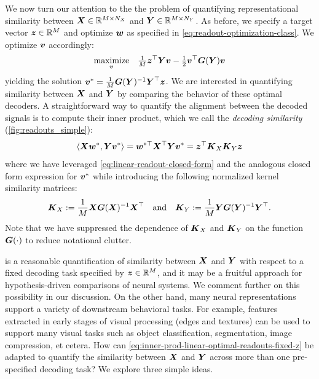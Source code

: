 We now turn our attention to the the problem of quantifying representational similarity between $\boldsymbol{X} \in \mathbb{R}^{M \times N_X}$ and $\boldsymbol{Y} \in \mathbb{R}^{M \times N_Y}$.
As before, we specify a target vector $\boldsymbol{z} \in \mathbb{R}^M$ and optimize $\boldsymbol{w}$ as specified in \cref{eq:readout-optimization-class}.
We optimize $\boldsymbol{v}$ accordingly:
\begin{align}
\underset{\boldsymbol{v}}{\text{maximize}} \quad \tfrac{1}{M} \boldsymbol{z}^\top \boldsymbol{Y} \boldsymbol{v} - \tfrac{1}{2} \boldsymbol{v}^\top \boldsymbol{G}(\boldsymbol{Y}) \boldsymbol{v}
\end{align}
yielding the solution $\boldsymbol{v}^* = \tfrac{1}{M} \boldsymbol{G}(\boldsymbol{Y})^{-1} \boldsymbol{Y}^\top \boldsymbol{z}$.
We are interested in quantifying similarity between $\boldsymbol{X}$ and $\boldsymbol{Y}$ by comparing the behavior of these optimal decoders.
A straightforward way to quantify the alignment between the decoded signals is to compute their inner product, which we call the \emph{decoding similarity} (\cref{fig:readouts_simple}):
\begin{equation}
\label{eq:inner-prod-linear-optimal-readouts-fixed-z}
\langle \boldsymbol{X} \boldsymbol{w}^*, \boldsymbol{Y} \boldsymbol{v}^* \rangle = \boldsymbol{w}^{*\top} \boldsymbol{X}^\top \boldsymbol{Y} \boldsymbol{v}^* = \boldsymbol{z}^\top \boldsymbol{K}_X\boldsymbol{K}_Y \boldsymbol{z} 
\end{equation}
where we have leveraged \cref{eq:linear-readout-closed-form} and the analogous closed form expression for $\boldsymbol{v}^*$ while introducing the following normalized kernel similarity matrices:
\begin{equation}
\label{eq:change-of-variables-generalized-whitening}
    \boldsymbol{K}_X:=\frac{1}{M}\boldsymbol{X}\boldsymbol{G}(\boldsymbol{X})^{-1}\boldsymbol{X}^\top \quad \text{and} \quad \boldsymbol{K}_Y:=\frac{1}{M}\boldsymbol{Y}\boldsymbol{G}(\boldsymbol{Y})^{-1}\boldsymbol{Y}^\top.
\end{equation}
Note that we have suppressed the dependence of $\boldsymbol{K}_X$ and $\boldsymbol{K}_Y$ on the function $\boldsymbol{G}(\cdot)$ to reduce notational clutter.

 is a reasonable quantification of similarity between $\boldsymbol{X}$ and $\boldsymbol{Y}$ with respect to a fixed decoding task specified by $\boldsymbol{z} \in \mathbb{R}^M$, and it may be a fruitful approach for hypothesis-driven comparisons of neural systems. We comment further on this possibility in our discussion.
On the other hand, many neural representations support a variety of downstream behavioral tasks.
For example, features extracted in early stages of visual processing (edges and textures) can be used to support many visual tasks such as object classification, segmentation, image compression, et cetera.
How can \cref{eq:inner-prod-linear-optimal-readouts-fixed-z} be adapted to quantify the similarity between $\boldsymbol{X}$ and $\boldsymbol{Y}$ across more than one pre-specified decoding task?
We explore three simple ideas.

